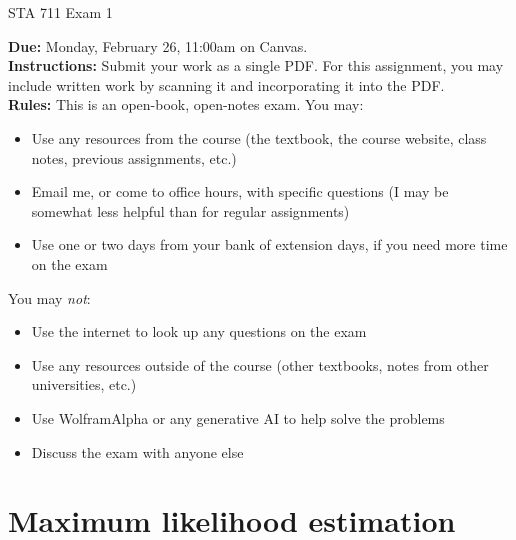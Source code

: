 \documentclass[11pt]{article}
\begin{document}
\begin{center}
\Large
STA 711 Exam 1\\
\normalsize
\vspace{5mm}
\end{center}

\noindent \textbf{Due:} Monday, February 26, 11:00am on Canvas.\\ 

\noindent \textbf{Instructions:} Submit your work as a single PDF. For this assignment, you may include written work by scanning it and incorporating it into the PDF.\\

\noindent \textbf{Rules:} This is an open-book, open-notes exam. You may:
\begin{itemize}
\item Use any resources from the course (the textbook, the course website, class notes, previous assignments, etc.)
\item Email me, or come to office hours, with specific questions (I may be somewhat less helpful than for regular assignments)
\item Use one or two days from your bank of extension days, if you need more time on the exam
\end{itemize}
You may \textit{not}:
\begin{itemize}
\item Use the internet to look up any questions on the exam
\item Use any resources outside of the course (other textbooks, notes from other universities, etc.)
\item Use WolframAlpha or any generative AI to help solve the problems
\item Discuss the exam with anyone else
\end{itemize}

\newpage

\section*{Maximum likelihood estimation}
\end{document}

